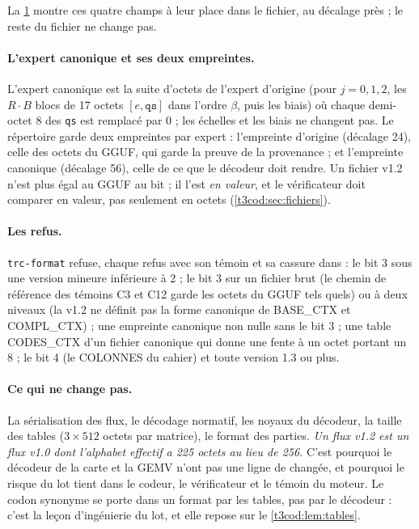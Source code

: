 \begin{figure}[tbp]
\centering
\SchemaCodonFormat
{}
\label{fig:t3-codon-format}
\end{figure}

La \cref{fig:t3-codon-format} montre ces quatre champs à leur place dans le fichier, au décalage près ; le reste du fichier ne change pas.

\paragraph{L'expert canonique et ses deux empreintes.} L'expert canonique est la suite d'octets de l'expert d'origine (pour $j = 0, 1, 2$, les $R \cdot B$ blocs de 17 octets $[e, \texttt{qs}]$ dans l'ordre $\beta$, puis les biais) où chaque demi-octet 8 des \texttt{qs} est remplacé par 0 ; les échelles et les biais ne changent pas. Le répertoire garde deux empreintes par expert : l'empreinte d'origine (décalage 24), celle des octets du GGUF, qui garde la preuve de la provenance ; et l'empreinte canonique (décalage 56), celle de ce que le décodeur doit rendre. Un fichier v1.2 n'est plus égal au GGUF au bit ; il l'est \emph{en valeur}, et le vérificateur doit comparer en valeur, pas seulement en octets (\cref{t3cod:sec:fichiers}).

\paragraph{Les refus.} \texttt{trc-format} refuse, chaque refus avec son témoin et sa cassure dans  : le bit 3 sous une version mineure inférieure à 2 ; le bit 3 sur un fichier brut (le chemin de référence des témoins C3 et C12 garde les octets du GGUF tels quels) ou à deux niveaux (la v1.2 ne définit pas la forme canonique de BASE\_CTX et COMPL\_CTX) ; une empreinte canonique non nulle sans le bit 3 ; une table CODES\_CTX d'un fichier canonique qui donne une fente à un octet portant un 8 ; le bit 4 (le COLONNES du cahier) et toute version 1.3 ou plus.

\paragraph{Ce qui ne change pas.} La sérialisation des flux, le décodage normatif, les noyaux du décodeur, la taille des tables ($3 \times 512$ octets par matrice), le format des parties. \emph{Un flux v1.2 est un flux v1.0 dont l'alphabet effectif a 225 octets au lieu de 256.} C'est pourquoi le décodeur de la carte et la GEMV n'ont pas une ligne de changée, et pourquoi le risque du lot tient dans le codeur, le vérificateur et le témoin du moteur. Le codon synonyme se porte dans un format par les tables, pas par le décodeur : c'est la leçon d'ingénierie du lot, et elle repose sur le \cref{t3cod:lem:tables}.

